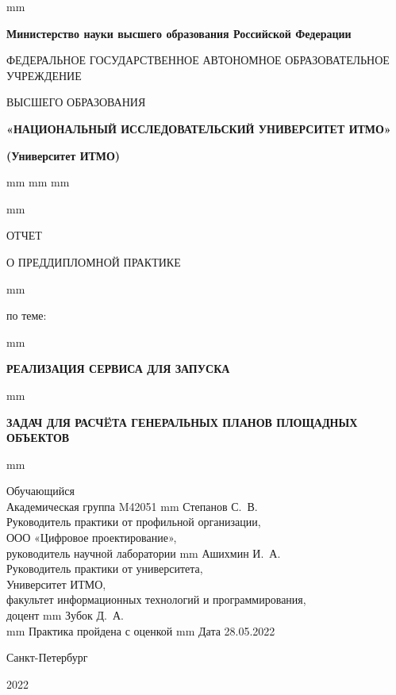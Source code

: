 \thispagestyle{empty}
 mm
\centerline{\footnotesize{\textbf{Министерство науки высшего образования Российской Федерации}}}
\centerline{\footnotesize{ФЕДЕРАЛЬНОЕ ГОСУДАРСТВЕННОЕ АВТОНОМНОЕ ОБРАЗОВАТЕЛЬНОЕ УЧРЕЖДЕНИЕ}}
\centerline{\small{ВЫСШЕГО ОБРАЗОВАНИЯ}}
\centerline{\textbf{«НАЦИОНАЛЬНЫЙ ИССЛЕДОВАТЕЛЬСКИЙ УНИВЕРСИТЕТ ИТМО»}}
\centerline{\textbf{(Университет ИТМО)}}
 mm
 mm
 mm



 mm
\centerline{\LARGE{ОТЧЕТ}}
\centerline{\LARGE{О ПРЕДДИПЛОМНОЙ ПРАКТИКЕ}}
 mm
\centerline{\large{по теме:}}
 mm
\centerline{\large\textbf{РЕАЛИЗАЦИЯ СЕРВИСА ДЛЯ ЗАПУСКА}}
 mm
\centerline{\large\textbf{ЗАДАЧ ДЛЯ РАСЧËТА ГЕНЕРАЛЬНЫХ ПЛАНОВ ПЛОЩАДНЫХ ОБЪЕКТОВ}}

 mm

\noindent Обучающийся \\
Академическая группа M42051  mm Степанов С.~В.\\

\noindent Руководитель практики от профильной организации, \\
ООО «Цифровое проектирование», \\
руководитель научной лаборатории  mm Ашихмин И.~А.\\

\noindent Руководитель практики от университета, \\
Университет ИТМО, \\
факультет информационных технологий и программирования, \\
доцент  mm Зубок Д.~А.\\

 mm
\hfill {Практика пройдена с оценкой \makebox[10mm]{\hrulefill} }
 mm
\hfill Дата 28.05.2022

\vfill \hfil \break
\centerline{\large Санкт-Петербург } \centerline{ 2022 }



